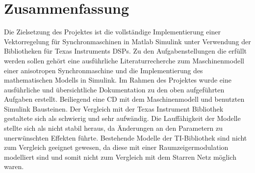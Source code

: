 
\chapter{Zusammenfassung}
\label{cha:zusammenfassung}

Die Zielsetzung des Projektes ist die vollständige Implementierung einer Vektorregelung für Synchronmaschinen in Matlab Simulink unter Verwendung der Bibliotheken für Texas Instruments DSPs.
Zu den Aufgabenstellungen die erfüllt werden sollen gehört eine ausführliche Literaturrecherche zum Maschinenmodell einer anisotropen Synchronmaschine und die Implementierung des mathematischen Modells in Simulink.
Im Rahmen des Projektes wurde eine ausführliche und übersichtliche Dokumentation zu den oben aufgeführten Aufgaben erstellt.
Beiliegend eine CD mit dem Maschinenmodell und benutzten Simulink Bausteinen.
Der Vergleich mit der Texas Instrument Bibliothek gestaltete sich als schwierig und sehr aufwändig.
Die Lauffähigkeit der Modelle stellte sich als nicht stabil heraus, da Änderungen an den Parametern zu unerwünschten Effekten führte.
Bestehende Modelle der TI-Bibliothek sind nicht zum Vergleich geeignet gewesen, da diese mit einer Raumzeigermodulation modelliert sind und somit nicht zum Vergleich mit dem Starren Netz möglich waren.






